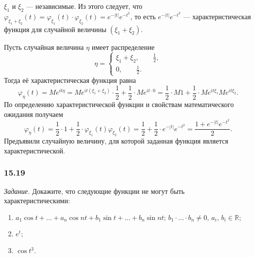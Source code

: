 \begin{enumerate}[label=\alph*)]
$ \xi_1$ и $ \xi_2$ --- независимые.
Из этого следует,
что $ \varphi_{ \xi_1 + \xi_2} \left( t \right) = \varphi_{ \xi_1} \left( t \right) \cdot \varphi_{ \xi_2} \left( t \right) = e^{- \left| t \right| } e^{- t^2}$,
то есть $e^{- \left| t \right| } e^{- t^2}$ --- характеристическая функция для случайной величины $ \left( \xi_1 + \xi_2 \right) $.

Пусть случайная величина $ \eta $ имеет распределение
$$ \eta =
\begin{cases}
\xi_1 + \xi_2, \qquad \frac{1}{2}, \\
0, \qquad \frac{1}{2}.
\end{cases}$$
Тогда её характеристическая функция равна
$$ \varphi_{ \eta } \left( t \right) =
Me^{it \eta } =
Me^{it \left( \xi_1 + \xi_2 \right) } \cdot \frac{1}{2} + \frac{1}{2} \cdot Me^{it \cdot 0} =
\frac{1}{2} \cdot M1 + \frac{1}{2} \cdot Me^{it \xi_1} Me^{it \xi_2}.$$
По определению характеристической функции и свойствам математического ожидания получаем
$$ \varphi_{ \eta } \left( t \right) =
\frac{1}{2} \cdot 1 + \frac{1}{2} \cdot \varphi_{ \xi_1} \left( t \right) \varphi_{ \xi_2} \left( t \right) =
\frac{1}{2} + \frac{1}{2} \cdot e^{- \left| t \right| }e^{- t^2} =
\frac{1 + e^{- \left| t \right| }e^{- t^2}}{2}.$$
Предъявили случайную величину, для которой заданная функция является характеристической.
\end{enumerate}

\subsubsection*{15.19}

\textit{Задание.} Докажите, что следующие функции не могут быть характеристическими:
\begin{enumerate}[label=\alph*)]
\item $a_1 \cos t + \dotsc + a_n \cos nt + b_1 \sin t + \dotsc + b_n \sin nt; \, b_1 \cdot \dotsc \cdot b_n \neq 0, \, a_i, \, b_i \in \mathbb{R}$;
\item $e^t$;
\item $ \cos t^3$.
\end{enumerate}

